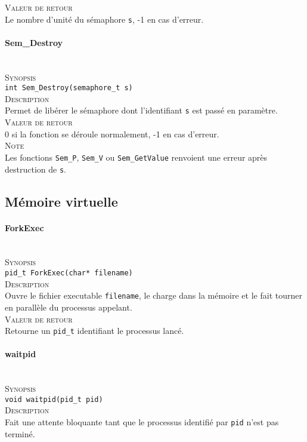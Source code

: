 \documentclass{report}
\newcommand{\myparagraph}[1]{\paragraph*{#1}\mbox{}\\}
\begin{document}
\textsc{Valeur de retour}\\
Le nombre d'unité du sémaphore \texttt{s}, -1 en cas d'erreur.\\

\myparagraph{Sem\_Destroy}

\textsc{Synopsis}\\	
	\texttt{int Sem\_Destroy(semaphore\_t s)}\\

\textsc{Description}\\
	Permet de libérer le sémaphore dont l'identifiant \texttt{s} est passé en paramètre.\\

\textsc{Valeur de retour}\\
0 si la fonction se déroule normalement, -1 en cas d'erreur.\\
	
\textsc{Note}\\
	Les fonctions \texttt{Sem\_P}, \texttt{Sem\_V} ou \texttt{Sem\_GetValue} renvoient une erreur après destruction de \texttt{s}.\\
\newpage
\subsection*{Mémoire virtuelle}
\myparagraph{ForkExec}

\textsc{Synopsis}\\	
	\texttt{pid\_t ForkExec(char* filename)}\\
	
\textsc{Description}\\
	Ouvre le fichier executable \texttt{filename}, le charge dans la mémoire et le fait tourner en parallèle du processus appelant.\\
	
\textsc{Valeur de retour}\\
	Retourne un \texttt{pid\_t} identifiant le processus lancé.\\
	

\myparagraph{waitpid}

\textsc{Synopsis}\\	
	\texttt{void waitpid(pid\_t pid)}\\
	
\textsc{Description}\\
	Fait une attente bloquante tant que le processus identifié par \texttt{pid} n'est pas terminé.\\
	
\end{document}
